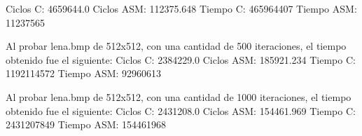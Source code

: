 \documentclass[10pt, a4paper]{article}
\begin{document}
\begin{itemize}
Ciclos C:                 4659644.0\newline
Ciclos ASM:               112375.648\newline
\newline
Tiempo C:                 465964407\newline
Tiempo ASM:               11237565\newline
\newline

Al probar lena.bmp de 512x512, con una cantidad de 500 iteraciones, el tiempo obtenido fue el siguiente:\newline
Ciclos C:                 2384229.0\newline
Ciclos ASM:               185921.234\newline
\newline
Tiempo C:                 1192114572\newline
Tiempo ASM:               92960613\newline
\newline

Al probar lena.bmp de 512x512, con una cantidad de 1000 iteraciones, el tiempo obtenido fue el siguiente:\newline
Ciclos C:                 2431208.0\newline
Ciclos ASM:               154461.969\newline
\newline
Tiempo C:                 2431207849\newline
Tiempo ASM:               154461968\newline
\newline


\end{itemize}
\end{document}
